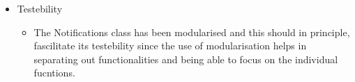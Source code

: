 \begin{itemize}
\begin{itemize}
		\end{itemize}
		
	\item Testebility
		\begin{itemize}
			\item  The Notifications class has been modularised and this should in principle, fascilitate its testebility since the use of modularisation helps in separating out functionalities and being able to focus on the individual fucntions.								
																
		\end{itemize}
\end{itemize}
